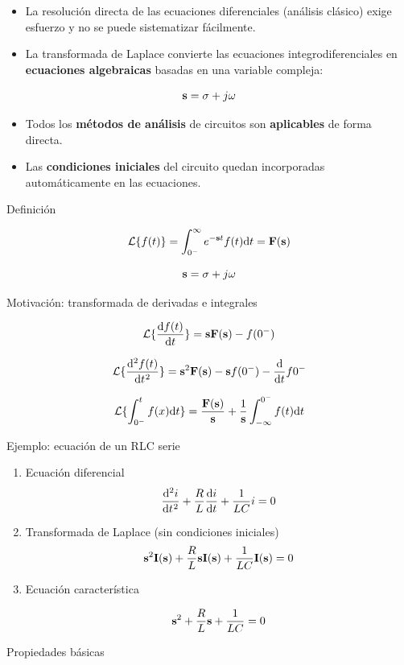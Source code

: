 \begin{itemize}
\item La resolución directa de las ecuaciones diferenciales (análisis clásico) exige esfuerzo y no se puede sistematizar fácilmente.
\item La transformada de Laplace convierte las ecuaciones integrodiferenciales en \textbf{ecuaciones algebraicas} basadas en una variable compleja:
\end{itemize}
\[
\mathbf{s} = \sigma + j\omega
\]
\begin{itemize}
\item Todos los \textbf{métodos de análisis} de circuitos son \textbf{aplicables} de forma directa.
\item Las \textbf{condiciones iniciales} del circuito quedan incorporadas automáticamente en las ecuaciones.
\end{itemize}

{Definición}

\[
  \mathcal{L}\{f(t)\} = \int_{0^-}^\infty e^{-\mathbf{s} t} f(t) \mathrm{d}t = \mathbf{F}(\mathbf{s})
\]

\[
\mathbf{s} = \sigma + j\omega
\]

{Motivación: transformada de derivadas e integrales}

\[
  \mathcal{L}\{\diff{f(t)}{t}\} =  \slp \mathbf{F}(\slp) - f(0^-)
\]

\[
  \mathcal{L}\{\diff[2]{f(t)}{t}\} = \slp^2 \laplace{F} - \slp f(0^-) - \diff*{f}{t}{0^-}
\]

\[
  \mathcal{L}\{\int_{0^-}^tf(x)\mathrm{d}t\} = \frac{\mathbf{F}(\mathbf{s})}{\mathbf{s}} + \frac{1}{\mathbf{s}} \int^{0^-}_{-\infty}f(t) \mathrm{d}t 
\]


{Ejemplo: ecuación de un RLC serie}

\begin{enumerate}
\item Ecuación diferencial
\label{sec:org259e223}
\[
  \diff[2]{i}{t} + \frac{R}{L} \diff{i}{t} + \frac{1}{LC} i = 0
\]

\item Transformada de Laplace (sin condiciones iniciales)
\label{sec:org7641c02}
\[
  \mathbf{s}^2 \mathbf{I}(\mathbf{s}) + \frac{R}{L} \mathbf{s} \mathbf{I}(\mathbf{s})  + \frac{1}{LC} \mathbf{I}(\mathbf{s}) = 0
\]

\item Ecuación característica
\label{sec:orgbca43ed}

\[
  \mathbf{s}^2 + \frac{R}{L} \mathbf{s}  + \frac{1}{LC} = 0
\]
\end{enumerate}

{Propiedades básicas}

